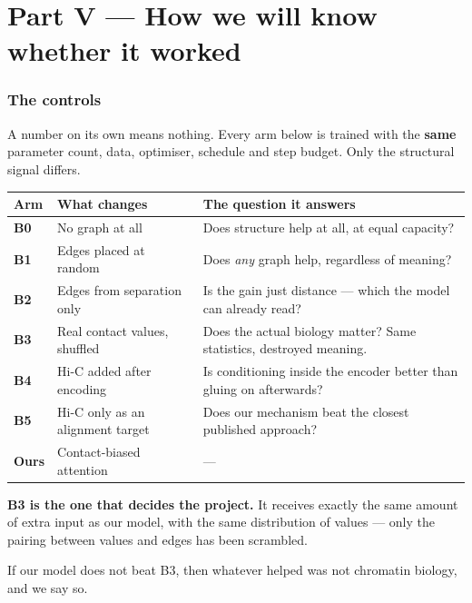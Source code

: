 \documentclass[11pt,a4paper]{article}
\begin{document}
\part*{Part V --- How we will know whether it worked}

\section{The controls}
\label{sec:baselines}

A number on its own means nothing. Every arm below is trained with the
\textbf{same} parameter count, data, optimiser, schedule and step budget. Only the
structural signal differs.

\begin{center}
\renewcommand{\arraystretch}{1.25}
\begin{tabular}{@{}l p{4.3cm} p{6.6cm}@{}}
\toprule
\textbf{Arm} & \textbf{What changes} & \textbf{The question it answers}\\
\midrule
\textbf{B0} & No graph at all &
  Does structure help at all, at equal capacity?\\
\textbf{B1} & Edges placed at random &
  Does \emph{any} graph help, regardless of meaning?\\
\textbf{B2} & Edges from separation only &
  Is the gain just distance --- which the model can already read?\\
\textbf{B3} & Real contact values, shuffled &
  Does the actual biology matter? Same statistics, destroyed meaning.\\
\textbf{B4} & Hi-C added after encoding &
  Is conditioning inside the encoder better than gluing on afterwards?\\
\textbf{B5} & Hi-C only as an alignment target &
  Does our mechanism beat the closest published approach?\\
\midrule
\textbf{Ours} & Contact-biased attention & ---\\
\bottomrule
\end{tabular}
\end{center}

\begin{plainbox}
\textbf{B3 is the one that decides the project.} It receives exactly the same
amount of extra input as our model, with the same distribution of values --- only
the pairing between values and edges has been scrambled.

If our model does not beat B3, then whatever helped was not chromatin biology, and
we say so.
\end{plainbox}
\end{document}

